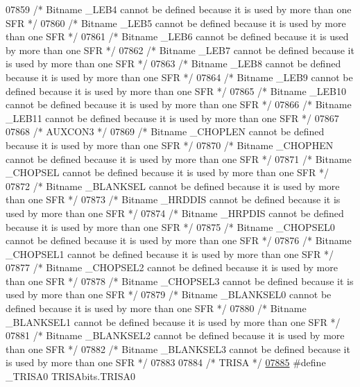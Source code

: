 \begin{DoxyCode}
07859 \textcolor{comment}{/* Bitname \_LEB4 cannot be defined because it is used by more than one SFR */}
07860 \textcolor{comment}{/* Bitname \_LEB5 cannot be defined because it is used by more than one SFR */}
07861 \textcolor{comment}{/* Bitname \_LEB6 cannot be defined because it is used by more than one SFR */}
07862 \textcolor{comment}{/* Bitname \_LEB7 cannot be defined because it is used by more than one SFR */}
07863 \textcolor{comment}{/* Bitname \_LEB8 cannot be defined because it is used by more than one SFR */}
07864 \textcolor{comment}{/* Bitname \_LEB9 cannot be defined because it is used by more than one SFR */}
07865 \textcolor{comment}{/* Bitname \_LEB10 cannot be defined because it is used by more than one SFR */}
07866 \textcolor{comment}{/* Bitname \_LEB11 cannot be defined because it is used by more than one SFR */}
07867 
07868 \textcolor{comment}{/* AUXCON3 */}
07869 \textcolor{comment}{/* Bitname \_CHOPLEN cannot be defined because it is used by more than one SFR */}
07870 \textcolor{comment}{/* Bitname \_CHOPHEN cannot be defined because it is used by more than one SFR */}
07871 \textcolor{comment}{/* Bitname \_CHOPSEL cannot be defined because it is used by more than one SFR */}
07872 \textcolor{comment}{/* Bitname \_BLANKSEL cannot be defined because it is used by more than one SFR */}
07873 \textcolor{comment}{/* Bitname \_HRDDIS cannot be defined because it is used by more than one SFR */}
07874 \textcolor{comment}{/* Bitname \_HRPDIS cannot be defined because it is used by more than one SFR */}
07875 \textcolor{comment}{/* Bitname \_CHOPSEL0 cannot be defined because it is used by more than one SFR */}
07876 \textcolor{comment}{/* Bitname \_CHOPSEL1 cannot be defined because it is used by more than one SFR */}
07877 \textcolor{comment}{/* Bitname \_CHOPSEL2 cannot be defined because it is used by more than one SFR */}
07878 \textcolor{comment}{/* Bitname \_CHOPSEL3 cannot be defined because it is used by more than one SFR */}
07879 \textcolor{comment}{/* Bitname \_BLANKSEL0 cannot be defined because it is used by more than one SFR */}
07880 \textcolor{comment}{/* Bitname \_BLANKSEL1 cannot be defined because it is used by more than one SFR */}
07881 \textcolor{comment}{/* Bitname \_BLANKSEL2 cannot be defined because it is used by more than one SFR */}
07882 \textcolor{comment}{/* Bitname \_BLANKSEL3 cannot be defined because it is used by more than one SFR */}
07883 
07884 \textcolor{comment}{/* TRISA */}
\hypertarget{a00009_source_l07885}{}\hyperlink{a00009_ad93af2aa1b2ca33654e9227e75b76e60}{07885} \textcolor{preprocessor}{#define \_TRISA0 TRISAbits.TRISA0}

\end{DoxyCode}
